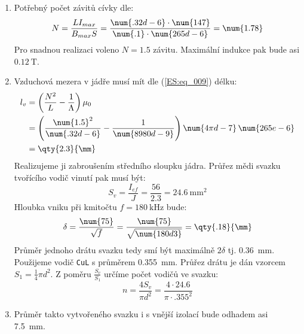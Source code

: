\begin{example}
\begin{enumerate}[noitemsep]
          Kvůli redukci ztrát v jádře volíme dovolené maximální sycení \(B_m\) pouze 
          \qty{0.1}{\tesla} (dovolená hodnota pro daný materiál je cca \qty{0.35}{\tesla}, 
          závisí na teplotě).
    \item Potřebný počet závitů cívky dle:
          \begin{equation*}
            N = \frac{LI_{max}}{B_{max}S}
              = \frac{\num{.32d-6}\cdot\num{147}}{\num{.1}\cdot\num{265d-6}}
              = \num{1.78}
          \end{equation*}
          Pro snadnou realizaci voleno \(N = \num{1.5}\) závitu. Maximální indukce pak bude 
          asi \(\qty{0,12}{\tesla}\).
    \item Vzduchová mezera v jádře musí mít dle (\ref{ES:eq_009}) délku:
          \begin{align*}
            l_v &= \left(\frac{N^2}{L}-\frac{1}{\Lambda}\right)\mu_0           \\
                &= \left(\frac{\num{1.5}^2}{\num{.32d-6}}-
                   \frac{1}{\num{8980d-9}}\right)\num{4\pi d-7}\,\num{265e-6}  \\
                &= \qty{2.3}{\mm}
          \end{align*}
          Realizujeme ji zabroušením středního sloupku jádra.
          Průřez mědi svazku tvořícího vodič vinutí pak musí být:
          \begin{equation*}
            S_v = \frac{I_{ef}}{J} = \frac{\num{56}}{\num{2.3}} = \qty{24.6}{\square\mm}
          \end{equation*}
          Hloubka vniku při kmitočtu \(f = \qty{180}{\kHz}\) bude:
          \begin{equation*}
            \delta = \frac{\num{75}}{\sqrt{f}} 
                   = \frac{\num{75}}{\sqrt{\num{180d3}}} = \qty{.18}{\mm}
          \end{equation*}
          Průměr jednoho drátu svazku tedy smí být maximálně \(2\delta\) tj. \qty{.36}{\mm}. 
          Použijeme vodič \texttt{CuL} s průměrem \qty{.355}{\mm}. Průřez drátu je dán vzorcem 
          \(S_1 = \frac{1}{4}\pi d^2\). Z poměru \(\frac{S_v}{S_1}\) určíme počet vodičů  ve 
          svazku:
          \begin{equation*}
            n = \frac{4S_v}{\pi d^2} 
              = \frac{\num{4}\cdot\num{24.6}}{\pi\cdot\num{.355}^2}
          \end{equation*}
    \item Průměr takto vytvořeného svazku i s vnější izolací bude odhadem asi \qty{7.5}{\mm}.

\end{enumerate}
\end{example}
